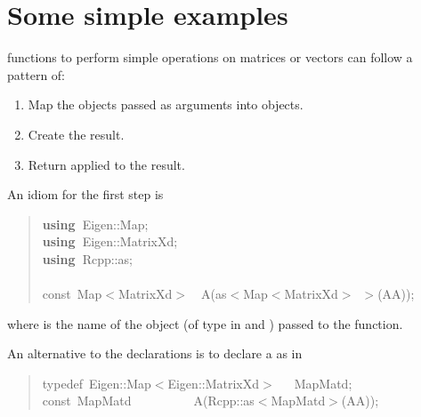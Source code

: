 \documentclass[shortnames,article,nojss]{jss}
\newcommand{\hlstd}[1]{\textcolor[rgb]{0,0,0}{#1}}
\newcommand{\hlopt}[1]{\textcolor[rgb]{0,0,0}{#1}}
\newcommand{\hlsym}[1]{\textcolor[rgb]{0,0,0}{#1}}
\newcommand{\hlkwa}[1]{\textcolor[rgb]{0.61,0.13,0.93}{\bf{#1}}}
\newcommand{\hlkwb}[1]{\textcolor[rgb]{0.13,0.54,0.13}{#1}}
\newcommand{\hlkwc}[1]{\textcolor[rgb]{0,0,1}{#1}}
\newcommand{\hlkwd}[1]{\textcolor[rgb]{0,0,0}{#1}}
\begin{document}
\section{Some simple examples}
\label{sec:simple}

 functions to perform simple operations on matrices or
vectors can follow a pattern of:
\begin{enumerate}
\item Map the  objects passed as arguments into  objects.
\item Create the result.
\item Return  applied to the result.
\end{enumerate}

An idiom for the first step is
%
\begin{quote}
  \noindent
  \ttfamily
  \hlstd{}\hlkwa{using\ }\hlstd{Eigen}\hlsym{::}\hlstd{Map}\hlsym{;}\hspace*{\fill}\\
  \hlstd{}\hlkwa{using\ }\hlstd{Eigen}\hlsym{::}\hlstd{MatrixXd}\hlsym{;}\hspace*{\fill}\\
  \hlstd{}\hlkwa{using\ }\hlstd{Rcpp}\hlsym{::}\hlstd{as}\hlsym{;}\hspace*{\fill}\\
  \hlstd{}\hspace*{\fill}\\
  \hlkwb{const\ }\hlstd{Map}\hlsym{$<$}\hlstd{MatrixXd}\hlsym{$>$}\hlstd{\ \ }\hlsym{}\hlstd{}\hlkwd{A}\hlstd{}\hlsym{(}\hlstd{as}\hlsym{$<$}\hlstd{Map}\hlsym{$<$}\hlstd{MatrixXd}\hlsym{$>$\ $>$(}\hlstd{AA}\hlsym{));}\hlstd{}\hspace*{\fill}\\
  \mbox{}
  \normalfont
\end{quote}
where  is the name of the  object (of type  in
 and ) passed to the  function.

An alternative to the  declarations is to declare a  as in
\begin{quote}
  \noindent
  \ttfamily
  \hlstd{}\hlkwc{typedef\ }\hlstd{Eigen}\hlopt{::}\hlstd{Map}\hlopt{$<$}\hlstd{Eigen}\hlopt{::}\hlstd{MatrixXd}\hlopt{$>$}\hlstd{\ \ \ }\hlopt{}\hlstd{MapMatd}\hlopt{;}\hspace*{\fill}\\
  \hlstd{}\hlkwb{const\ }\hlstd{MapMatd}\hlstd{\ \ \ \ \ \ \ \ \ \ }\hlstd{}\hlkwd{A}\hlstd{}\hlopt{(}\hlstd{Rcpp}\hlopt{::}\hlstd{as}\hlopt{$<$}\hlstd{MapMatd}\hlopt{$>$(}\hlstd{AA}\hlopt{));}\hlstd{}\hspace*{\fill}\\
  \mbox{}
  \normalfont
  \normalsize
\end{quote}
\end{document}
